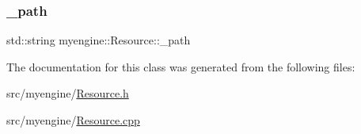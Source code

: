 \subsubsection{\texorpdfstring{\+\_\+path}{\_path}}
{\footnotesize\ttfamily std\+::string myengine\+::\+Resource\+::\+\_\+path\hspace{0.3cm}{\ttfamily [protected]}}



The documentation for this class was generated from the following files\+:\begin{DoxyCompactItemize}
\item 
src/myengine/\hyperlink{_resource_8h}{Resource.\+h}\item 
src/myengine/\hyperlink{_resource_8cpp}{Resource.\+cpp}\end{DoxyCompactItemize}
